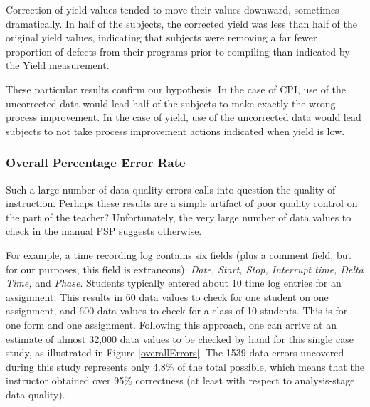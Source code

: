Correction of yield values tended to move their values downward, sometimes
dramatically.  In half of the subjects, the corrected yield was less than
half of the original yield values, indicating that subjects were removing a
far fewer proportion of defects from their programs prior to compiling than
indicated by the Yield measurement.

These particular results confirm our hypothesis. In the case of CPI, use of
the uncorrected data would lead half of the subjects to make exactly
the wrong process improvement. In the case of yield, use of the uncorrected
data would lead subjects to not take process improvement actions 
indicated when yield is low. 


\subsubsection{Overall Percentage Error Rate}
\label{sec:instruction}
 
Such a large number of data quality errors calls into question the 
quality of instruction. Perhaps these results are a simple artifact of
poor quality control on the part of the teacher? Unfortunately, 
the very large number of data values to check in the manual PSP suggests
otherwise. 

For example, a time recording log contains six fields (plus a comment
field, but for our purposes, this field is extraneous): {\em Date, Start, Stop, Interrupt time,
Delta Time,} and {\em Phase}. Students typically entered about 10 time log entries
for an assignment.  This results in 60 data values to check for one student
on one assignment, and 600 data values to check for a class of 10 students.
This is for one form and one assignment. Following this approach, one can
arrive at an estimate of almost 32,000 data values to be checked by hand
for this single case study, as illustrated in Figure \ref{overallErrors}.
The 1539 data errors uncovered during this study represents only 4.8\% of
the total possible, which means that the instructor obtained over 95\%
correctness (at least with respect to analysis-stage data quality).

